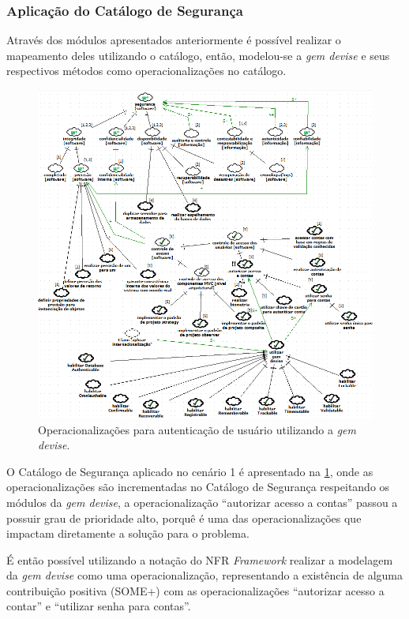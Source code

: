 \subsubsection{Aplicação do Catálogo de Segurança}

Através dos módulos apresentados anteriormente é possível realizar o mapeamento deles utilizando o catálogo, então, modelou-se a \textit{gem devise} e seus respectivos métodos como operacionalizações no catálogo. 

\pagebreak

\begin{figure}[h!]
	\centering
	\includegraphics[keepaspectratio=true,scale=0.7]{figuras/catalogoPersona1.PNG}
	\caption{Operacionalizações para autenticação de usuário utilizando a \textit{gem devise}.}
	\label{catalogoPersona1}
\end{figure}


O Catálogo de Segurança aplicado no cenário 1 é apresentado na \ref{catalogoPersona1}, onde as operacionalizações são incrementadas no Catálogo de Segurança respeitando os módulos da \textit{gem devise}, a operacionalização  “autorizar acesso a contas” passou a possuir grau de prioridade alto, porquê é uma das operacionalizações que impactam diretamente a solução para o problema. 

É então possível utilizando a notação do NFR \textit{Framework} realizar a modelagem da \textit{gem devise} como uma operacionalização, representando a existência de alguma contribuição positiva (SOME+) com as operacionalizações  “autorizar acesso a contar” e “utilizar senha para contas”.
 
